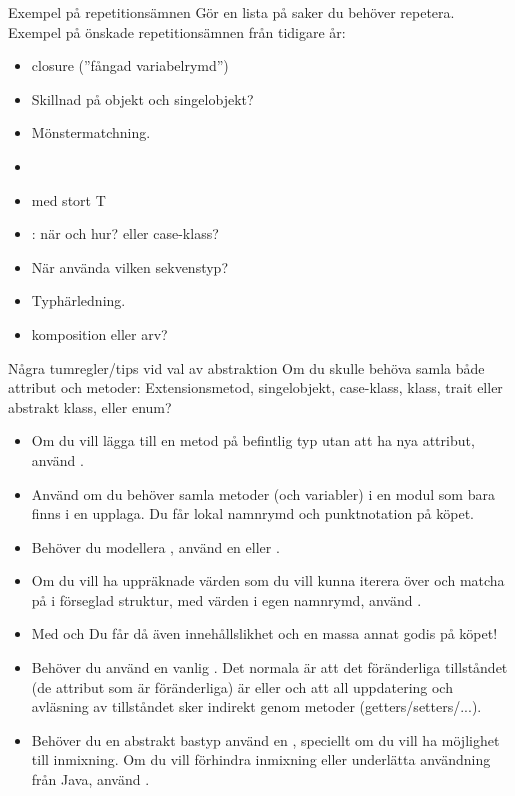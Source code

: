 \begin{Slide}{Exempel på repetitionsämnen}
Gör en lista på saker du behöver repetera.\\Exempel på önskade repetitionsämnen från tidigare år:
\begin{itemize}\SlideFontSmall
  \item closure (''fångad variabelrymd'') 
  \item Skillnad på objekt och singelobjekt? 
  \item Mönstermatchning. 
  \item {}  
  \item {} med stort T  
  \item {}: när och hur? eller case-klass? 
  \item När använda vilken sekvenstyp? 
  \item Typhärledning. 
  \item komposition eller arv?  
\end{itemize}  
\end{Slide}

\begin{Slide}{Några tumregler/tips vid val av abstraktion}\SlideFontSmall
Om du skulle behöva samla både attribut och metoder:
Extensionsmetod, singelobjekt, case-klass, klass, trait eller abstrakt klass, eller enum?
\begin{itemize}\SlideFontTiny
\item Om du vill lägga till en metod på befintlig typ utan att ha nya attribut, använd .
\item Använd  om du behöver samla metoder (och variabler) i en modul som bara finns i en upplaga. Du får lokal namnrymd och punktnotation på köpet.
\item Behöver du modellera , använd en  eller .  
\item Om du vill ha uppräknade värden som du vill kunna iterera över och matcha på i förseglad struktur, med värden i egen namnrymd, använd .
\item Med  och  Du får då även innehållslikhet och en massa annat godis på köpet!
\item Behöver du   använd en vanlig . Det normala är att det föränderliga tillståndet (de attribut som är föränderliga) är  eller  och att all uppdatering och avläsning av tillståndet sker indirekt genom metoder (getters/setters/...).
\item Behöver du en abstrakt bastyp använd en , speciellt om du vill ha möjlighet till inmixning.  Om du vill förhindra inmixning eller underlätta användning från Java, använd . 
\end{itemize}
\end{Slide}


